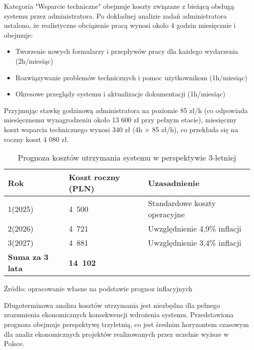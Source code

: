 Kategoria "Wsparcie techniczne" obejmuje koszty związane z bieżącą obsługą systemu przez administratora. Po dokładnej analizie zadań administratora ustalono, że realistyczne obciążenie pracą wynosi około 4 godzin miesięcznie i obejmuje:
\begin{itemize}
    \item Tworzenie nowych formularzy i przepływów pracy dla każdego wydarzenia (2h/miesiąc)
    \item Rozwiązywanie problemów technicznych i pomoc użytkownikom (1h/miesiąc)
    \item Okresowe przeglądy systemu i aktualizacje dokumentacji (1h/miesiąc)
\end{itemize}

Przyjmując stawkę godzinową administratora na poziomie 85 zł/h (co odpowiada miesięcznemu wynagrodzeniu około 13 600 zł przy pełnym etacie), miesięczny koszt wsparcia technicznego wynosi 340 zł (4h × 85 zł/h), co przekłada się na roczny koszt 4 080 zł.

\begin{table}[ht]
    \centering
    \caption[Prognoza kosztów utrzymania systemu w perspektywie 3-letniej, źródło: opracowanie własne na podstawie prognoz inflacyjnych \cite{NBP2025}]{Prognoza kosztów utrzymania systemu w perspektywie 3-letniej}
    \renewcommand{\arraystretch}{1.3} %
    \begin{tabular}{| p{} | p{} | p{} |}
        \hline
        \textbf{Rok} & \textbf{Koszt roczny (PLN)} & \textbf{Uzasadnienie} \\
        \hline
        1(2025) & 4~500 & Standardowe koszty operacyjne \\
        \hline
        2(2026) & 4~721 & Uwzględnienie 4,9\% inflacji \\
        \hline
        3(2027) & 4~881 & Uwzględnienie 3,4\% inflacji \\
        \hline
        \textbf{Suma za 3 lata} & \textbf{14~102} & \textbf{} \\
        \hline
    \end{tabular}
    \vspace{0.5em}
    \par\raggedright\footnotesize{Źródło: opracowanie własne na podstawie prognoz inflacyjnych \cite{NBP2025}}
\end{table}

Długoterminowa analiza kosztów utrzymania jest niezbędna dla pełnego zrozumienia ekonomicznych konsekwencji wdrożenia systemu. Przedstawiona prognoza obejmuje perspektywę trzyletnią, co jest średnim horyzontem czasowym dla analiz ekonomicznych projektów realizowanych przez uczelnie wyższe w Polsce. ~\parencite[s. 293]{paczek2018}

